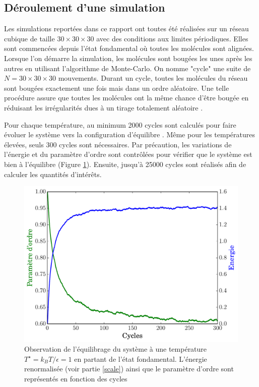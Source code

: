 \documentclass[11pt,a4paper]{article}
\numberwithin{equation}{section}
\begin{document}
\subsection{Déroulement d'une simulation} 
Les simulations reportées dans ce rapport ont toutes été réalisées sur un réseau cubique de taille $30\times 30\times 30$ avec des conditions aux limites périodiques. Elles sont commencées depuis l'état fondamental où toutes les molécules sont alignées. Lorsque l'on démarre la simulation, les molécules sont bougées les unes après les autres en utilisant l'algorithme de Monte-Carlo. On nomme "cycle" une suite de $N = 30\times 30\times 30$ mouvements. Durant un cycle, toutes les molécules du réseau sont bougées exactement une fois mais dans un ordre aléatoire. Une telle procédure assure que toutes les molécules ont la même chance d'être bougée en réduisant les irrégularités dues à un tirage totalement aléatoire \cite{fabbri}. 
\medskip

Pour chaque température, au minimum 2000 cycles sont calculés pour faire évoluer le système vers la configuration d'équilibre . Même pour les températures élevées, seuls 300 cycles sont nécessaires. Par précaution, les variations de l'énergie et du paramètre d'ordre sont contrôlées pour vérifier que le système est bien à l'équilibre (Figure \ref{equilibrage}). Ensuite, jusqu'à 25000 cycles sont réalisés afin de calculer les quantités d'intérêts.

\begin{figure}[h!]
    \centering	    
	\includegraphics[scale=0.6]{figures/equilibrage.pdf}
    \caption{Observation de l'équilibrage du système à une température $T^\star = k_B T/\epsilon = 1$ en partant de l'état fondamental. L'énergie renormalisée (voir partie \ref{scale}) ainsi que le paramètre d'ordre sont représentés en fonction des cycles}
    	\label{equilibrage} 
\end{figure}
\end{document}
